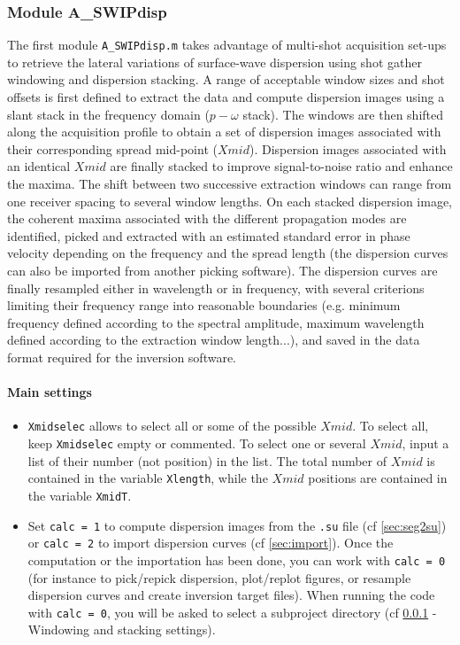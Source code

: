 \documentclass[twoside,a4paper]{article}
\begin{document}
\subsubsection{Module A\_SWIPdisp}
\label{sec:moduleA}
The first module \verb|A_SWIPdisp.m| takes advantage of multi-shot acquisition set-ups to retrieve the lateral variations of surface-wave dispersion using shot gather windowing and dispersion stacking. A range of acceptable window sizes and shot offsets is first defined to extract the data and compute dispersion images using a slant stack in the frequency domain ($p-\omega$ stack). The windows are then shifted along the acquisition profile to obtain a set of dispersion images associated with their corresponding spread mid-point ($Xmid$). Dispersion images associated with an identical $Xmid$ are finally stacked to improve signal-to-noise ratio and enhance the maxima. The shift between two successive extraction windows can range from one receiver spacing to several window lengths. On each stacked dispersion image, the coherent maxima associated with the different propagation modes are identified, picked and extracted with an estimated standard error in phase velocity depending on the frequency and the spread length (the dispersion curves can also be imported from another picking software). The dispersion curves are finally resampled either in wavelength or in frequency, with several criterions limiting their frequency range into reasonable boundaries (e.g. minimum frequency defined according to the spectral amplitude, maximum wavelength defined according to the extraction window length...), and saved in the data format required for the inversion software.

\paragraph{Main settings}
\begin{itemize}[leftmargin=*]
\setlength\itemsep{2ex}
\item \verb|Xmidselec| allows to select all or some of the possible $Xmid$. To select all, keep \verb|Xmidselec| empty or commented. To select one or several $Xmid$, input a list of their number (not position) in the list. The total number of $Xmid$ is contained in the variable \verb|Xlength|, while the $Xmid$ positions are contained in the variable \verb|XmidT|.

\item Set \verb|calc = 1| to compute dispersion images from the \verb|.su| file (cf \ref{sec:seg2su}) or \verb|calc = 2| to import dispersion curves (cf \ref{sec:import}). Once the computation or the importation has been done, you can work with \verb|calc = 0| (for instance to pick/repick dispersion, plot/replot figures, or resample dispersion curves and create inversion target files). When running the code with \verb|calc = 0|, you will be asked to select a subproject directory (cf \ref{sec:moduleA} - Windowing and stacking settings).
\end{itemize}
\end{document}
